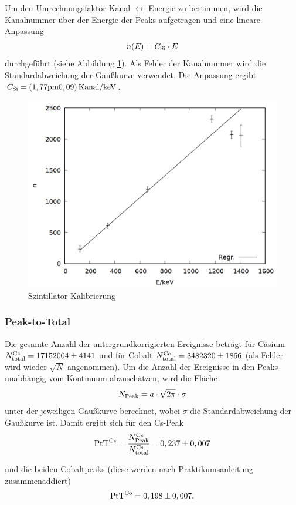 Um den Umrechnungsfaktor Kanal $\leftrightarrow$ Energie zu bestimmen, wird die Kanalnummer über der Energie der Peaks aufgetragen und eine lineare Anpassung \[n(E) = C\ind{Si}\cdot E\] durchgeführt (siehe Abbildung \ref{fig:si_gauge}). Als Fehler der Kanalnummer wird die Standardabweichung der Gaußkurve verwendet. Die Anpassung ergibt $C\ind{Si} = \si{(1,77\pm 0,09)\,Kanal/keV}$.

\begin{figure}[h]
\centering
\includegraphics[width=0.7\linewidth]{data/si_gauge.png}
\caption{Szintillator Kalibrierung}
\label{fig:si_gauge}
\end{figure}

\subsubsection*{Peak-to-Total}
Die gesamte Anzahl der untergrundkorrigierten Ereignisse beträgt für Cäsium $N\ind{total}\upd{Cs} = 17152004 \pm 4141$ und für Cobalt $N\ind{total}\upd{Co} = 3482320\pm 1866$ (als Fehler wird wieder $\sqrt{N}$ angenommen). Um die Anzahl der Ereignisse in den Peaks unabhängig vom Kontinuum abzuschätzen, wird die Fläche
\begin{align}
N\ind{Peak} = a\cdot\sqrt{2\pi}\cdot \sigma 
\label{eq:npeak}
\end{align}
 unter der jeweiligen Gaußkurve berechnet, wobei $\sigma$ die Standardabweichung der Gaußkurve ist.
Damit ergibt sich für den Cs-Peak
\begin{align*} 
\text{PtT}\upd{Cs} = \cfrac{N\ind{Peak}\upd{Cs}}{N\ind{total}\upd{Cs}} = 0,237\pm 0,007 
\end{align*}

und die beiden Cobaltpeaks (diese werden nach Praktikumsanleitung zusammenaddiert)
\begin{align*}
 \text{PtT}\upd{Co} = 0,198\pm 0,007.
\end{align*}

